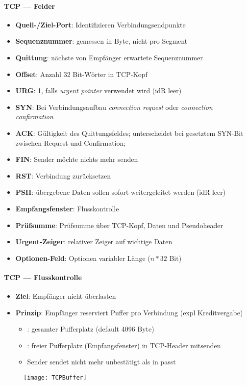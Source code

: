 \paragraph{TCP --- Felder}
\begin{itemize}
  \item \textbf{Quell-/Ziel-Port}: Identifizieren Verbindungsendpunkte
  \item \textbf{Sequenznummer}: gemessen in Byte, nicht pro Segment
  \item \textbf{Quittung}: nächste von Empfänger erwartete Sequenznummer
  \item \textbf{Offset}: Anzahl 32 Bit-Wörter in TCP-Kopf
  \item \textbf{URG}: 1, falls \emph{urgent pointer} verwendet wird (idR leer)
  \item \textbf{SYN}: Bei Verbindungsaufbau \emph{connection request} oder \emph{connection confirmation}
  \item \textbf{ACK}: Gültigkeit des Quittungsfeldes; unterscheidet bei gesetztem SYN-Bit zwischen Request und Confirmation; 
  \item \textbf{FIN}: Sender möchte nichts mehr senden
  \item \textbf{RST}: Verbindung zurücksetzen
  \item \textbf{PSH}: übergebene Daten sollen sofort weitergeleitet werden (idR leer)
  \item \textbf{Empfangsfenster}: Flusskontrolle
  \item \textbf{Prüfsumme}: Prüfsumme über TCP-Kopf, Daten und Pseudoheader
  \item \textbf{Urgent-Zeiger}: relativer Zeiger auf wichtige Daten
  \item \textbf{Optionen-Feld}: Optionen variabler Länge (\( n * 32 \) Bit)
\end{itemize}

\paragraph{TCP --- Flusskontrolle}
\begin{itemize}
  \item \textbf{Ziel}: Empfänger nicht überlasten
  \item \textbf{Prinzip}: Empfänger reserviert Puffer pro Verbindung (expl Kreditvergabe)
  \begin{itemize}
    \item {}: gesamter Pufferplatz (default 4096 Byte)
    \item {}: freier Pufferplatz (Empfangsfenster) in TCP-Header mitsenden
    \item Sender sendet nicht mehr unbestätigt als in  passt
  \end{itemize}
\end{itemize}
\begin{figure}[H]\centering\label{TCPBuffer}\texttt{[image: TCPBuffer]}\end{figure}

